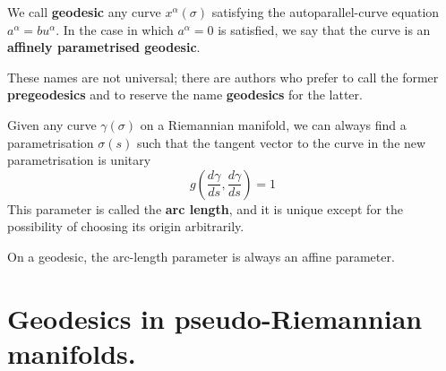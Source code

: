 \begin{points}
\item We call \textbf{geodesic} any curve $x^\alpha(\sigma)$ satisfying the autoparallel-curve equation $a^\alpha=bu^\alpha$. In the case in which $a^\alpha=0$ is satisfied, we say that the curve is an \textbf{affinely parametrised geodesic}.

\item These names are not universal; there are authors who prefer to call the former \textbf{pregeodesics} and to reserve the name \textbf{geodesics} for the latter.

\item Given any curve $\gamma(\sigma)$ on a Riemannian manifold, we can always find a parametrisation $\sigma(s)$ such that the tangent vector to the curve in the new parametrisation is unitary
\[
  g\left(\frac{d\gamma}{ds},\frac{d\gamma}{ds}\right)=1
\]
This parameter is called the \textbf{arc length}, and it is unique except for the possibility of choosing its origin arbitrarily.

\item On a geodesic, the arc-length parameter is always an affine parameter.
\end{points}

\section{Geodesics in pseudo-Riemannian manifolds.}

